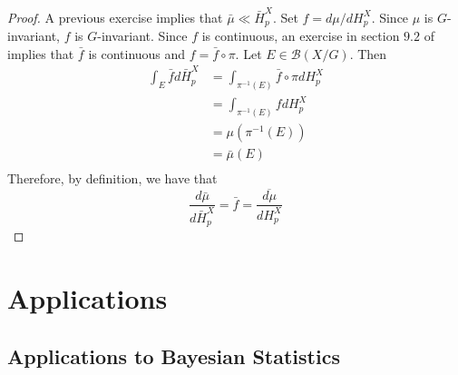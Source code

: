 \documentclass[12pt]{amsart}
\theoremstyle{definition}
\newcommand{\MB}{\mathcal{B}}
\begin{document}
	\begin{proof}
	A previous exercise implies that $\bar{\mu} \ll \bar{H}_p^X$. Set $f = d \mu /d H_p^X$. Since $\mu$ is $G$-invariant, $f$ is $G$-invariant. Since $f$ is continuous, an exercise in section $9.2$ of \cite{analysis} implies that $\bar{f}$ is continuous and $f = \bar{f} \circ \pi$. Let $E \in \MB(X/G)$. Then 
	\begin{align*}
	\int_E \bar{f} d \bar{H}_p^X 
	&= \int_{\pi^{-1}(E)} \bar{f} \circ \pi dH_p^X \\
	&= \int_{\pi^{-1}(E)} f dH_p^X \\
	&= \mu(\pi^{-1}(E)) \\
	&= \bar{\mu}(E) \\
\end{align*}	 
	Therefore, by definition, we have that
	\begin{equation*}
	\frac{d \bar{\mu}}{d \bar{H}_p^X} = \bar{f} = \overline{\frac{d \mu}{d H_p^X}}
	\end{equation*}
	\end{proof}
	
	
	
	
	
	
	
	
	
	
	
	
	
	
	
	
	
	
	
	
	
	
	
	
	
	
	
	
	
	
	
	
	
	\newpage
	\section{Applications}
	
	\subsection{Applications to Bayesian Statistics}
	
\end{document}
